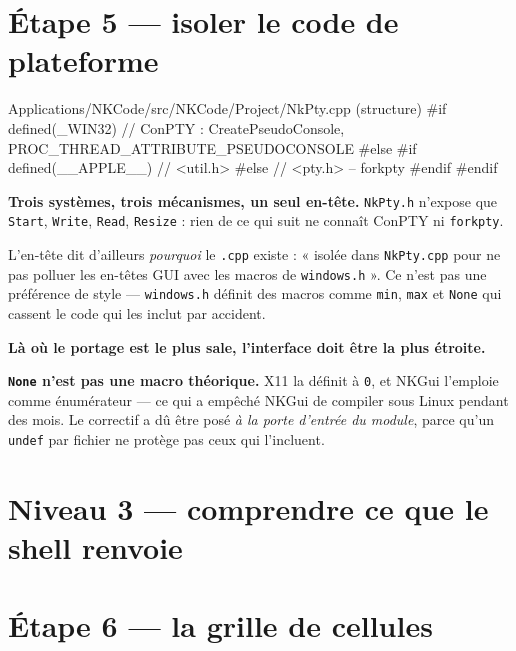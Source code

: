 \section{Étape 5 --- isoler le code de plateforme}

\begin{nkcode}{Applications/NKCode/src/NKCode/Project/NkPty.cpp (structure)}
#if defined(_WIN32)
    // ConPTY : CreatePseudoConsole, PROC_THREAD_ATTRIBUTE_PSEUDOCONSOLE
#else
  #if defined(__APPLE__)
    // <util.h>
  #else
    // <pty.h>   -- forkpty
  #endif
#endif
\end{nkcode}

\begin{nkretenir}
\textbf{Trois systèmes, trois mécanismes, un seul en-tête.} \texttt{NkPty.h}
n'expose que \texttt{Start}, \texttt{Write}, \texttt{Read}, \texttt{Resize} :
rien de ce qui suit ne connaît ConPTY ni \texttt{forkpty}.

L'en-tête dit d'ailleurs \emph{pourquoi} le \texttt{.cpp} existe : « isolée dans
\texttt{NkPty.cpp} pour ne pas polluer les en-têtes GUI avec les macros de
\texttt{windows.h} ». Ce n'est pas une préférence de style ---
\texttt{windows.h} définit des macros comme \texttt{min}, \texttt{max} et
\texttt{None} qui cassent le code qui les inclut par accident.

\textbf{Là où le portage est le plus sale, l'interface doit être la plus
étroite.}
\end{nkretenir}

\begin{nkpiege}
\textbf{\texttt{None} n'est pas une macro théorique.} X11 la définit à \texttt{0},
et NKGui l'emploie comme énumérateur --- ce qui a empêché NKGui de compiler sous
Linux pendant des mois. Le correctif a dû être posé \emph{à la porte d'entrée du
module}, parce qu'un \texttt{undef} par fichier ne protège pas ceux qui
l'incluent.
\end{nkpiege}

\section*{Niveau 3 --- comprendre ce que le shell renvoie}

\section{Étape 6 --- la grille de cellules}


